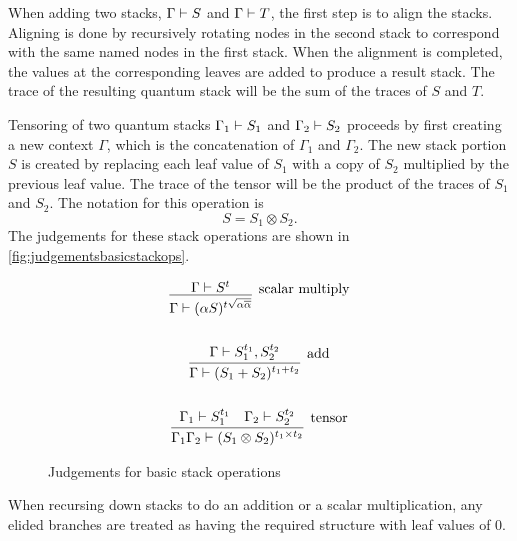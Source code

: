 When adding two stacks, $\Gamma \vdash S$ and $\Gamma \vdash T$,
the first step is to align the stacks. Aligning is done by recursively
rotating nodes in the second stack to correspond with the
same named nodes in the first stack. When the alignment is completed,
the values at the corresponding leaves are added to produce a 
result stack. The trace
of the resulting quantum stack will be the sum of the traces of $S$ and $T$.

Tensoring of two quantum stacks $\Gamma_1 \vdash S_1$ and
$\Gamma_2 \vdash S_2$ proceeds by first creating a 
new context $\Gamma$, which is the concatenation of
$\Gamma_1$ and $\Gamma_2$. The new stack portion $S$ is
created by replacing each leaf value of $S_1$ with
a copy of $S_2$ multiplied by the previous leaf value. The 
trace of the tensor will be the product of the traces of 
$S_1$ and $S_2$. The notation for this operation is
\[S=S_1\otimes S_2.\]
The judgements for these stack operations are shown 
in \vref{fig:judgementsbasicstackops}.

\begin{figure}[htbp]
\[
\begin{gathered}
\infer[\raisebox{1em}{scalar multiply}]
   {\Gamma \qentail  (\alpha S)^{t\sqrt{\alpha\overline{\alpha}}}}
   {\Gamma \qentail  S^t}\\ 
\\
\infer[\raisebox{1.5em}{add}]
   {\Gamma \qentail (S_1 + S_2)^{t_1+t_2}} 
   {\Gamma \qentail  S_1^{t_1}, S_2^{t_2}}\\ 
\\
\infer[\raisebox{1.5em}{tensor}]
   {\Gamma_1 \Gamma_2 \qentail (S_1 \otimes S_2)^{t_1\times t_2}} 
   {\Gamma_1 \qentail  S_1^{t_1} & \Gamma_2 \qentail S_2^{t_2}}
\end{gathered}
\]
\caption{Judgements for basic stack operations}\label{fig:judgementsbasicstackops}
\end{figure}


When recursing down stacks to do an addition or a scalar multiplication,
any elided branches are treated as having the required structure with 
leaf values of $0$.

